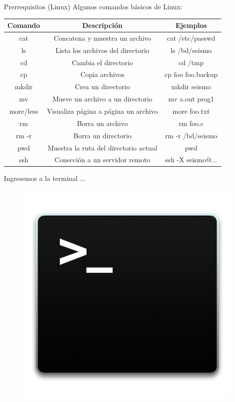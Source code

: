 \documentclass[11pt]{beamer}
\begin{document}
\begin{frame}{Prerrequisitos (Linux)}
Algunos comandos básicos de Linux:
\begin{table}
{\small
\begin{tabular}{|c|c|c|}
\hline 
 {\bf Comando} & {\bf Descripción} & {\bf Ejemplos}\\ 
\hline 
cat  & Concatena y muestra un archivo & cat /etc/passwd\\ 
\hline 
ls & Lista los archivos del directorio & ls /bd/seismo \\ 
\hline 
cd & Cambia el directorio & cd /tmp \\ 
\hline 
cp & Copia archivos & cp foo foo.backup \\ 
\hline 
mkdir & Crea un directorio & mkdir seismo \\ 
\hline 
mv & Mueve un archivo a un directorio & mv a.out prog1 \\ 
\hline 
more/less & Visualiza página a página un archivo & more foo.txt \\ 
\hline 
rm  & Borra un archivo & rm foo.c \\ 
\hline 
rm -r  & Borra un directorio & rm -r /bd/seismo\\ 
\hline 
pwd & Muestra la ruta del directorio actual & pwd \\ 
\hline
ssh & Conección a un servidor remoto & ssh -X seismo@...\\
\hline
\end{tabular}}
\end{table} 
\end{frame}

\begin{frame}
Ingresemos a la terminal ...\\

\begin{figure}
\includegraphics[scale=0.5]{terminal.png}
\end{figure}
\end{frame}
\end{document}
